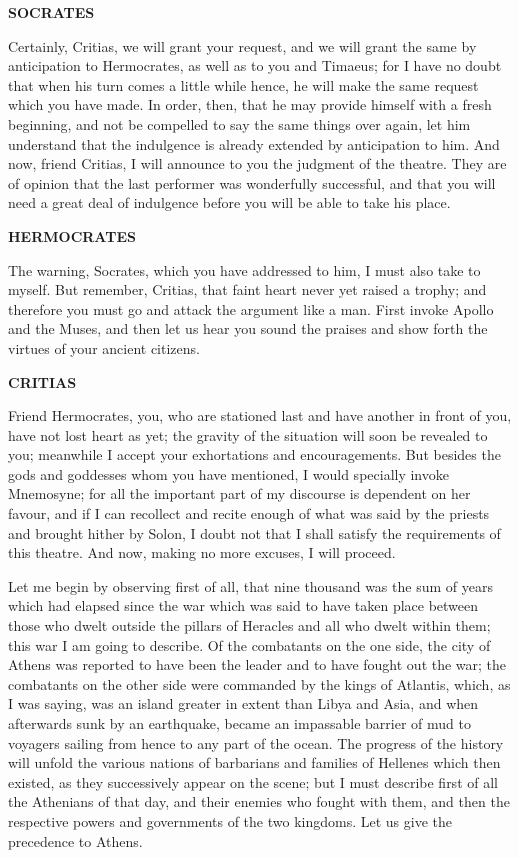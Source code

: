 \documentclass[11pt,letter]{article}
\begin{document}
\par \textbf{SOCRATES}
\par   Certainly, Critias, we will grant your request, and we will grant the same by anticipation to Hermocrates, as well as to you and Timaeus; for I have no doubt that when his turn comes a little while hence, he will make the same request which you have made. In order, then, that he may provide himself with a fresh beginning, and not be compelled to say the same things over again, let him understand that the indulgence is already extended by anticipation to him. And now, friend Critias, I will announce to you the judgment of the theatre. They are of opinion that the last performer was wonderfully successful, and that you will need a great deal of indulgence before you will be able to take his place.

\par \textbf{HERMOCRATES}
\par   The warning, Socrates, which you have addressed to him, I must also take to myself. But remember, Critias, that faint heart never yet raised a trophy; and therefore you must go and attack the argument like a man. First invoke Apollo and the Muses, and then let us hear you sound the praises and show forth the virtues of your ancient citizens.

\par \textbf{CRITIAS}
\par   Friend Hermocrates, you, who are stationed last and have another in front of you, have not lost heart as yet; the gravity of the situation will soon be revealed to you; meanwhile I accept your exhortations and encouragements. But besides the gods and goddesses whom you have mentioned, I would specially invoke Mnemosyne; for all the important part of my discourse is dependent on her favour, and if I can recollect and recite enough of what was said by the priests and brought hither by Solon, I doubt not that I shall satisfy the requirements of this theatre. And now, making no more excuses, I will proceed.

\par  Let me begin by observing first of all, that nine thousand was the sum of years which had elapsed since the war which was said to have taken place between those who dwelt outside the pillars of Heracles and all who dwelt within them; this war I am going to describe. Of the combatants on the one side, the city of Athens was reported to have been the leader and to have fought out the war; the combatants on the other side were commanded by the kings of Atlantis, which, as I was saying, was an island greater in extent than Libya and Asia, and when afterwards sunk by an earthquake, became an impassable barrier of mud to voyagers sailing from hence to any part of the ocean. The progress of the history will unfold the various nations of barbarians and families of Hellenes which then existed, as they successively appear on the scene; but I must describe first of all the Athenians of that day, and their enemies who fought with them, and then the respective powers and governments of the two kingdoms. Let us give the precedence to Athens.
\end{document}
